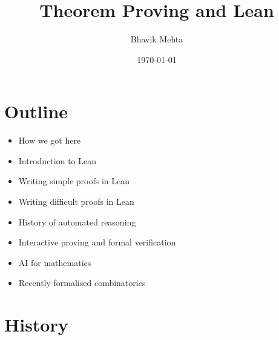 \documentclass[usenames,dvipsnames,handout]{beamer}
\title{Theorem Proving and Lean}
\author{Bhavik Mehta}
\institute{Bernoulli Center}
\date[\today]{\today}
\begin{document}
\begin{frame}
  \titlepage
\end{frame}

\section{Outline}
\begin{frame}
  \begin{itemize}[<+->]
  \item How we got here
  \item Introduction to Lean
  \item Writing simple proofs in Lean
  \item Writing difficult proofs in Lean
  \end{itemize}
\end{frame}
\begin{frame}
  \begin{itemize}[<+->]
    \item History of automated reasoning
    \item Interactive proving and formal verification
    \item AI for mathematics
    \item Recently formalised combinatorics
  \end{itemize}
\end{frame}
\section{History}
\end{document}
